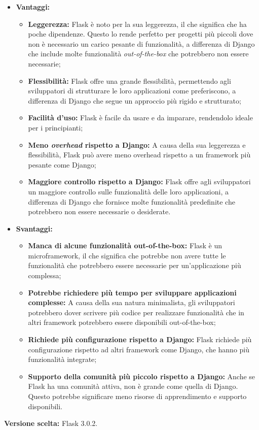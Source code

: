 \documentclass[10pt, a4paper]{article}
\begin{document}
\begin{itemize}
\item \textbf{Vantaggi:}
\begin{itemize}
\item \textbf{Leggerezza:} Flask è noto per la sua leggerezza, il che significa che ha poche dipendenze. Questo lo rende perfetto per progetti più piccoli dove non è necessario un carico pesante di funzionalità, a differenza di Django che include molte funzionalità \textit{out-of-the-box\pg} che potrebbero non essere necessarie;
\item \textbf{Flessibilità:} Flask offre una grande flessibilità, permettendo agli sviluppatori di strutturare le loro applicazioni come preferiscono, a differenza di Django che segue un approccio più rigido e strutturato;
\item \textbf{Facilità d'uso:} Flask è facile da usare e da imparare, rendendolo ideale per i principianti;
\item \textbf{Meno \textit{overhead\pg} rispetto a Django:} A causa della sua leggerezza e flessibilità, Flask può avere meno overhead rispetto a un framework più pesante come Django;
\item \textbf{Maggiore controllo rispetto a Django:} Flask offre agli sviluppatori un maggiore controllo sulle funzionalità delle loro applicazioni, a differenza di Django che fornisce molte funzionalità predefinite che potrebbero non essere necessarie o desiderate.
\end{itemize}
\item \textbf{Svantaggi:}
\begin{itemize}
\item \textbf{Manca di alcune funzionalità out-of-the-box:} Flask è un microframework, il che significa che potrebbe non avere tutte le funzionalità che potrebbero essere necessarie per un'applicazione più complessa;
\item \textbf{Potrebbe richiedere più tempo per sviluppare applicazioni complesse:} A causa della sua natura minimalista, gli sviluppatori potrebbero dover scrivere più codice per realizzare funzionalità che in altri framework potrebbero essere disponibili out-of-the-box;
\item \textbf{Richiede più configurazione rispetto a Django:} Flask richiede più configurazione rispetto ad altri framework come Django, che hanno più funzionalità integrate;
\item \textbf{Supporto della comunità più piccolo rispetto a Django:} Anche se Flask ha una comunità attiva, non è grande come quella di Django. Questo potrebbe significare meno risorse di apprendimento e supporto disponibili.
\end{itemize}
\end{itemize}
\textbf{Versione scelta:} Flask 3.0.2.
\end{document}

